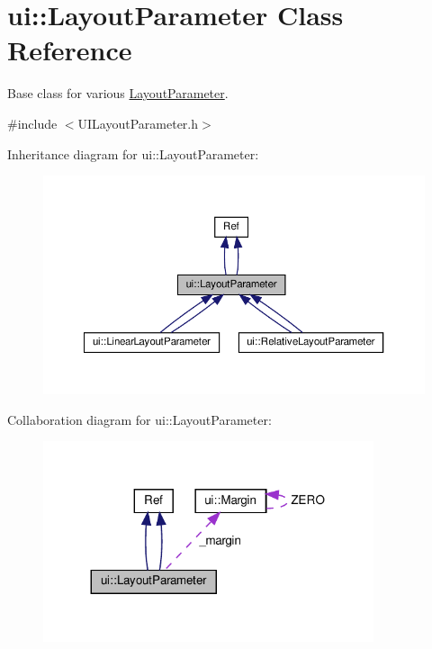 \hypertarget{classui_1_1LayoutParameter}{}\section{ui\+:\+:Layout\+Parameter Class Reference}
\label{classui_1_1LayoutParameter}


Base class for various \hyperlink{classui_1_1LayoutParameter}{Layout\+Parameter}.  




{\ttfamily \#include $<$U\+I\+Layout\+Parameter.\+h$>$}



Inheritance diagram for ui\+:\+:Layout\+Parameter\+:
\nopagebreak
\begin{figure}[H]
\begin{center}
\leavevmode
\includegraphics[width=350pt]{classui_1_1LayoutParameter__inherit__graph}
\end{center}
\end{figure}


Collaboration diagram for ui\+:\+:Layout\+Parameter\+:
\nopagebreak
\begin{figure}[H]
\begin{center}
\leavevmode
\includegraphics[width=275pt]{classui_1_1LayoutParameter__coll__graph}
\end{center}
\end{figure}
